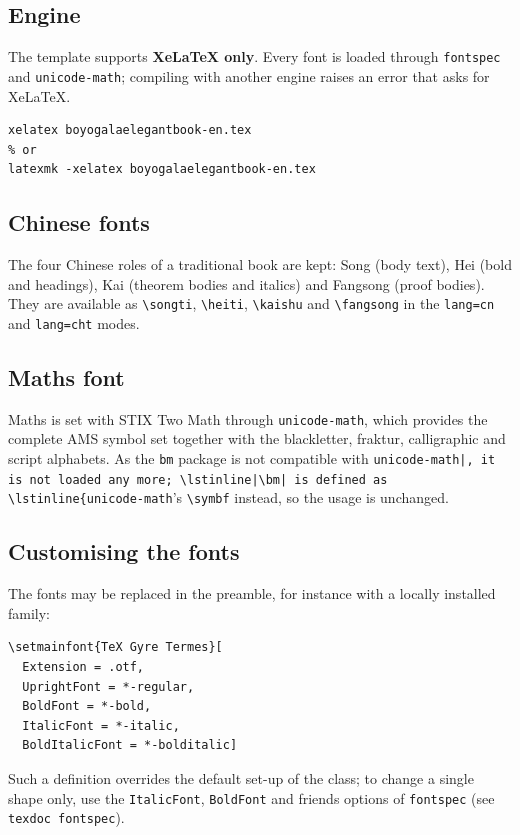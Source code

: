 \documentclass[11pt]{boyogalaelegantbook}
\begin{document}
\subsection{Engine}
The template supports \textbf{XeLaTeX only}.  Every font is loaded through \lstinline{fontspec} and \lstinline{unicode-math}; compiling with another engine raises an error that asks for XeLaTeX.

\begin{lstlisting}
xelatex boyogalaelegantbook-en.tex
% or
latexmk -xelatex boyogalaelegantbook-en.tex
\end{lstlisting}

\subsection{Chinese fonts}
The four Chinese roles of a traditional book are kept: Song (body text), Hei (bold and headings), Kai (theorem bodies and italics) and Fangsong (proof bodies).  They are available as \lstinline|\songti|, \lstinline|\heiti|, \lstinline|\kaishu| and \lstinline|\fangsong| in the \lstinline|lang=cn| and \lstinline|lang=cht| modes.

\subsection{Maths font}
Maths is set with STIX Two Math through \lstinline{unicode-math}, which provides the complete AMS symbol set together with the blackletter, fraktur, calligraphic and script alphabets.  As the \lstinline{bm} package is not compatible with \lstinline{unicode-math|, it is not loaded any more; \lstinline|\bm| is defined as \lstinline{unicode-math}'s \lstinline|\symbf| instead, so the usage is unchanged.

\subsection{Customising the fonts}
The fonts may be replaced in the preamble, for instance with a locally installed family:

\begin{lstlisting}
\setmainfont{TeX Gyre Termes}[
  Extension = .otf,
  UprightFont = *-regular,
  BoldFont = *-bold,
  ItalicFont = *-italic,
  BoldItalicFont = *-bolditalic]
\end{lstlisting}

Such a definition overrides the default set-up of the class; to change a single shape only, use the \lstinline{ItalicFont}, \lstinline{BoldFont} and friends options of \lstinline{fontspec} (see \lstinline{texdoc fontspec}).
\end{document}
